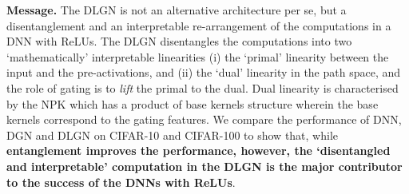 
\textbf{Message.} The DLGN is not an alternative architecture per se, but a disentanglement and an interpretable re-arrangement of the computations in a DNN with ReLUs. The DLGN disentangles the computations into two  `mathematically' interpretable linearities (i) the `primal' linearity between the input and the pre-activations, and (ii) the `dual' linearity in the path space, and the role of gating is to \emph{lift} the primal to the dual. Dual linearity is characterised by the NPK which has a product of base kernels structure wherein the base kernels correspond to the gating features. We compare the performance of DNN, DGN and DLGN on CIFAR-10 and CIFAR-100 to show that, while \textbf{entanglement improves the performance, however, the `disentangled and interpretable'  computation in the DLGN is the major contributor to the success of the DNNs with ReLUs}.

